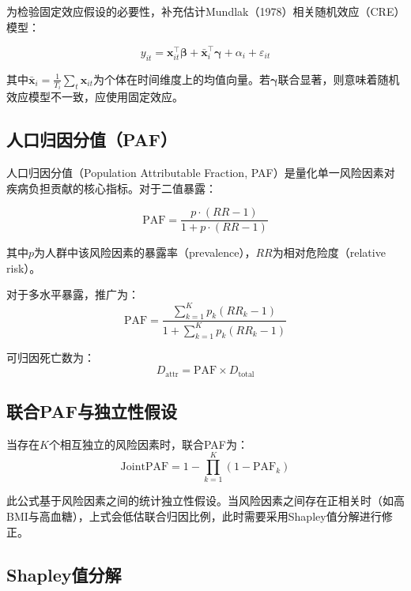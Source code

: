 \documentclass[12pt,a4paper]{ctexart}
\begin{document}
为检验固定效应假设的必要性，补充估计Mundlak（1978）相关随机效应（CRE）模型：

\begin{equation}
    y_{it} = \mathbf{x}_{it}^\top \bm{\beta} + \bar{\mathbf{x}}_i^\top \bm{\gamma} + \alpha_i + \varepsilon_{it}
\end{equation}

其中$\bar{\mathbf{x}}_i = \frac{1}{T_i}\sum_{t} \mathbf{x}_{it}$为个体在时间维度上的均值向量。若$\bm{\gamma}$联合显著，则意味着随机效应模型不一致，应使用固定效应。

\subsection{人口归因分值（PAF）}

人口归因分值（Population Attributable Fraction, PAF）是量化单一风险因素对疾病负担贡献的核心指标。对于二值暴露：

\begin{equation}
\label{eq:paf}
\text{PAF} = \frac{p \cdot (RR - 1)}{1 + p \cdot (RR - 1)}
\end{equation}

其中$p$为人群中该风险因素的暴露率（prevalence），$RR$为相对危险度（relative risk）。

对于多水平暴露，推广为：
\begin{equation}
    \text{PAF} = \frac{\sum_{k=1}^{K} p_k (RR_k - 1)}{1 + \sum_{k=1}^{K} p_k (RR_k - 1)}
\end{equation}

可归因死亡数为：
\begin{equation}
    D_{\text{attr}} = \text{PAF} \times D_{\text{total}}
\end{equation}

\subsection{联合PAF与独立性假设}

当存在$K$个相互独立的风险因素时，联合PAF为：
\begin{equation}
\label{eq:joint-paf}
    \text{JointPAF} = 1 - \prod_{k=1}^{K}(1 - \text{PAF}_k)
\end{equation}

此公式基于风险因素之间的统计独立性假设。当风险因素之间存在正相关时（如高BMI与高血糖），上式会低估联合归因比例，此时需要采用Shapley值分解进行修正。

\subsection{Shapley值分解}
\end{document}
